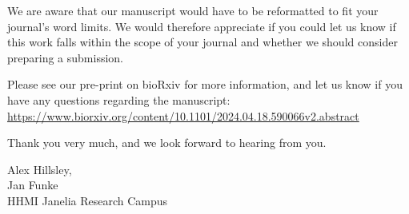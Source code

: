 \documentclass{article}
\begin{document}
We are aware that our manuscript would have to be reformatted to fit your
journal's word limits. We would therefore appreciate if you could let us know
if this work falls within the scope of your journal and whether we should
consider preparing a submission.

Please see our pre-print on bioRxiv for more information, and let us know if
you have any questions regarding the manuscript:
\url{https://www.biorxiv.org/content/10.1101/2024.04.18.590066v2.abstract}

Thank you very much, and we look forward to hearing from you.

\vspace{5mm}
Alex Hillsley,\\
Jan Funke\\
HHMI Janelia Research Campus
\end{document}
